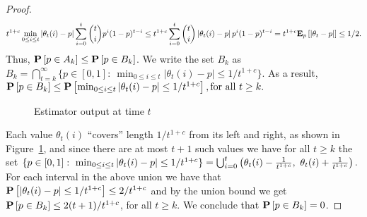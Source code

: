 \begin{proof}
  \[
    t^{1 + c} \min_{0 \leq i \leq t} \left| \theta_t(i) - p \right|
    \sum_{i=0}^t \binom{t}{i} p^i (1-p)^{t-i}
    \leq
    t^{1 + c} \sum_{i=0}^t \binom{t}{i} \left| \theta_t(i) - p \right| p^i (1-p)^{t-i}
    = t^{1+c} \bm{\mathrm{E}}_{p} \left[ |\theta_t  - p | \right]
    \leq
    1/2.
  \]
  Thus, $\bm{\mathrm{P}}\left[p \in A_k\right] \leq \bm{\mathrm{P}}\left[p \in B_k\right]$.
  We write the set $B_k$ as \(
    B_k = \bigcap_{t=k}^{\infty}\{p \in [0,1]:~ \min_{0 \leq
      i \leq t} |\theta_t(i)-p|\leq 1/t^{1+c}
    \}.
  \)
  As a result,
  \(
    \bm{\mathrm{P}}\left[p \in B_k\right]
    \leq \bm{\mathrm{P}}\left[\min_{0 \leq i \leq t}|\theta_t(i)-p| \leq 1/t^{1+c} \right],
    \text{for all } t \geq k.
  \)
  \begin{figure}
    \centering
    \caption{Estimator output at time $t$} \label{fig:estimator}
  \end{figure}
  Each value $\theta_t(i)$ \enquote{covers} length $1/t^{1+c}$ from
  its left and right, as shown in Figure~\ref{fig:estimator},
  and since there are at most $t+1$ such values
  we have for all $t \geq k$ the set
  \(
    \{
    p \in [0,1]:\ {\min_{0 \leq i \leq t} |\theta_t(i)-p| \leq 1/t^{1+c} }
    \}
    =
    \bigcup_{i=0}^t
    \left(
    \theta_t(i) - \frac{1}{t^{1+c}},\ \theta_t(i) + \frac{1}{t^{1+c}}
    \right).
  \)
  For each interval in the above union we have that
  $\bm{\mathrm{P}}\left[|\theta_t(i)-p| \leq 1/t^{1+c}\right]\leq 2/t^{1+c}$
  and by the union bound we get
  $\bm{\mathrm{P}}\left[p \in B_k\right] \leq 2(t+1)/t^{1+c}$, for all $t \geq k$.
  We conclude that $\bm{\mathrm{P}}\left[p \in B_k\right] =0$.
\end{proof}

